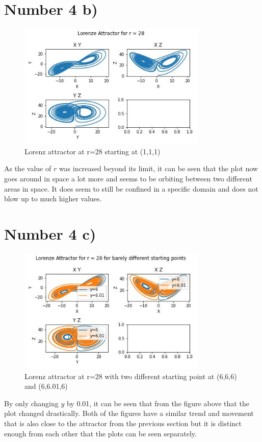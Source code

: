 \documentclass{article}
\begin{document}
	\section*{Number 4 b)}
		\begin{figure}[H]
			\centering
			\includegraphics[width=0.8\textwidth]{images/rk44b.jpg}
			\caption{\label{} Lorenz attractor at r=28 starting at (1,1,1)}
		\end{figure}
		As the value of $r$ was increased beyond its limit, it can be seen that the plot now goes around in space a lot more and seems to be orbiting between two different areas in space. It does seem to still be confined in a specific domain and does not blow up to much higher values. 
	\section*{Number 4 c)}
		\begin{figure}[H]
		\centering
		\includegraphics[width=0.8\textwidth]{images/rk44c.jpg}
		\caption{\label{} Lorenz attractor at r=28 with two different starting point at (6,6,6) and (6,6.01,6)}
		\end{figure}
		By only changing $y$ by 0.01, it can be seen that from the figure above that the plot changed drastically. Both of the figures have a similar trend and movement that is also close to the attractor from the previous section but it is distinct enough from each other that the plots can be seen separately. 
	
\end{document}
